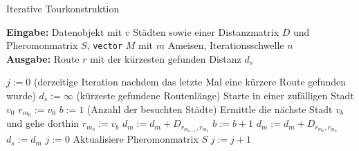 \documentclass[doktyp=barbeit, sprache=german]{TUBAFarbeiten}
\begin{document}
\begin{algorithm}
\caption{Iterative Tourkonstruktion}
\label{IterativeTour}
\textbf{Eingabe:} Datenobjekt mit $v$ Städten sowie einer Distanzmatrix $D$ und Pheromonmatrix $S$, \texttt{vector} $M$ mit $m$ Ameisen, Iterationsschwelle $n$
\\\textbf{Ausgabe:} Route $r$ mit der kürzesten gefunden Distanz $d_s$
\begin{algorithmic}[1]
\State $j := 0$ (derzeitige Iteration nachdem das letzte Mal eine kürzere Route gefunden wurde)
\State $d_s := \infty$ (kürzeste gefundene Routenlänge)
\State Starte in einer zufälligen Stadt $v_0$
\State $r_{m_0} := v_0$
\State $b := 1$ (Anzahl der besuchten Städte)
\State Ermittle die nächste Stadt $v_b$ und gehe dorthin
\State $r_{m_b} := v_b$
\State $d_m := d_m + D_{r_{m_{b-1}},r_{m_b}}$
\State $b := b + 1$
\EndWhile
\State $d_m := d_m + D_{r_{m_b},r_{m_0}}$
\State $d_s := d_m$
\State $j := 0$
\EndIf
\State Aktualisiere Pheromonmatrix $S$
\State $j := j + 1$
\EndIf
\EndFor
\end{algorithmic}
\end{algorithm}
\end{document}
